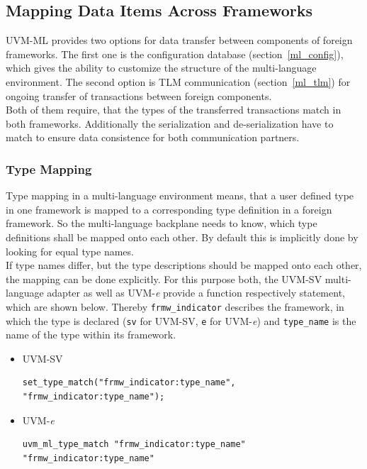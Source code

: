 \subsection{Mapping Data Items Across Frameworks }\label{type_mapping}
UVM-ML provides two options for data transfer between components of foreign frameworks. The first one is the configuration
database (section~\ref{ml_config}), which gives the ability to customize the structure of the multi-language
environment. The second option is TLM communication (section~\ref{ml_tlm}) for ongoing transfer of transactions between foreign components.\\
Both of them require, that the types of the transferred transactions match in both frameworks. Additionally the
serialization and de-serialization have to match to ensure data consistence for both communication partners.

\subsubsection{Type Mapping}
Type mapping in a multi-language environment means, that a user defined type in
one framework is mapped to a corresponding type definition in a foreign framework. So the multi-language
backplane needs to know, which type definitions shall be mapped onto each other. By default this is implicitly done by
looking for equal type names.\\
If type names differ, but the type descriptions should be mapped onto each other, the mapping can be done explicitly.
For this purpose both, the UVM-SV multi-language adapter as well as UVM-\textit{e} provide a function respectively
statement, which are shown below. Thereby \lstinline$frmw_indicator$ describes the framework, in which the type is
declared (\lstinline$sv$ for UVM-SV, \lstinline$e$ for UVM-\textit{e}) and \lstinline$type_name$ is the name
of the type within its framework.
\begin{itemize}
  \item{UVM-SV}
\begin{lstlisting}
set_type_match("frmw_indicator:type_name", "frmw_indicator:type_name");
\end{lstlisting} 
  \item{UVM-\textit{e}}
\begin{lstlisting}
uvm_ml_type_match "frmw_indicator:type_name" "frmw_indicator:type_name"
\end{lstlisting} 
\end{itemize}


